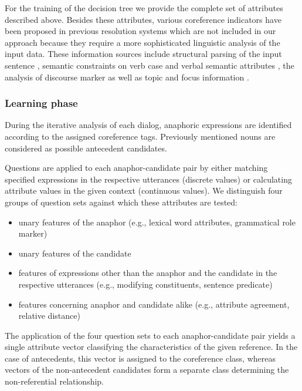 \noindent
For the training of the decision tree we provide the complete set of attributes described above.
Besides these attributes, various coreference indicators have been proposed
in previous resolution systems which are not included in our approach because they require
a more sophisticated linguistic analysis of the input data. 
These information sources include structural parsing of the input sentence \cite{Lappin94},
semantic constraints on verb case and verbal semantic attributes \cite{Nakaiwa96},
the analysis of discourse marker \cite{Aone95} as well as topic and focus information
\cite{Murata97}.
\vspace*{-0.25em}

\subsubsection{Learning phase}
\label{dt-learn}

During the iterative analysis of each dialog, anaphoric expressions are identified
according to the assigned coreference tags. Previously mentioned nouns
are considered as possible antecedent candidates.

Questions are applied to each anaphor-candidate pair by either matching specified
expressions in the respective utterances (discrete values) or calculating attribute values
in the given context (continuous values).
We distinguish four groups of question sets against which these attributes are tested:

\begin{itemize}
\item unary features of the anaphor
      (e.g., lexical word attributes, grammatical role marker)
\item unary features of the candidate
\item features of expressions other than the anaphor and the candidate in the respective utterances 
      (e.g., modifying constituents, sentence predicate)
\item features concerning anaphor and candidate alike 
      (e.g., attribute agreement, relative distance)
\end{itemize}

The application of the four question sets to each anaphor-candidate pair
yields a single attribute vector classifying the characteristics of the given reference.
In the case of antecedents, this vector is assigned to the coreference class, whereas vectors
of the non-antecedent candidates form a separate class determining the non-referential relationship.

